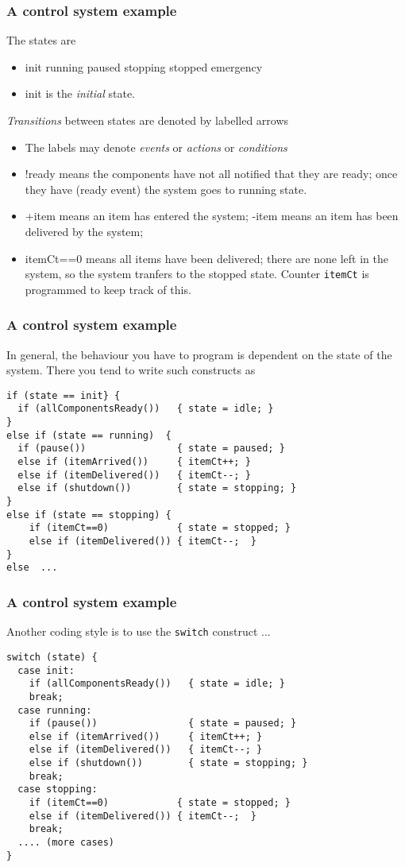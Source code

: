\documentclass[10pt, hyperref={pdfpagelabels=false}]{beamer}
\begin{document}
\begin{frame}
\frametitle{A control system example}
The states are
\begin{itemize}
\item {\color{brown} \large init running paused stopping stopped emergency}
\item {\color{brown} init} is the \emph{initial} state.
\end{itemize}

\emph{Transitions} between states are denoted by labelled arrows
\begin{itemize}
\item The labels may denote \emph{events} or \emph{actions} or \emph{conditions}
\item {\color{blue}!ready} means the components have not all notified that they are ready; once they have ({\color{blue}ready} event) the system goes to {\color{brown}running} state.
\item {\color{blue}+item} means an item has entered the system; {\color{blue}-item} means an item has been delivered by the system;
\item {\color{blue}itemCt==0} means all items have been delivered; there are none left in the system, so the system tranfers to the  {\color{brown}stopped} state. Counter \texttt{itemCt} is  programmed to keep track of this.
\end{itemize}
\end{frame}

\begin{frame} [fragile]
\frametitle{A control system example}
In general, the behaviour you have to program is dependent on the state of the system. There you tend to write such constructs as
{\color{blue}
\begin{verbatim}
if (state == init} {
  if (allComponentsReady())   { state = idle; }
}
else if (state == running)  {
  if (pause())                { state = paused; }
  else if (itemArrived())     { itemCt++; }
  else if (itemDelivered())   { itemCt--; }
  else if (shutdown())        { state = stopping; }
}
else if (state == stopping) {
    if (itemCt==0)            { state = stopped; }
    else if (itemDelivered()) { itemCt--;  }
}
else  ...
\end{verbatim}
}
\end{frame}

\begin{frame} [fragile]
\frametitle{A control system example}
Another coding style is to use the \texttt{switch} construct ...
{\color{blue}
\begin{verbatim}
switch (state) {
  case init:
    if (allComponentsReady())   { state = idle; }
    break;
  case running:
    if (pause())                { state = paused; }
    else if (itemArrived())     { itemCt++; }
    else if (itemDelivered())   { itemCt--; }
    else if (shutdown())        { state = stopping; }
    break;
  case stopping:
    if (itemCt==0)            { state = stopped; }
    else if (itemDelivered()) { itemCt--;  }
    break;
  .... (more cases)
} 
\end{verbatim}
}
\end{frame}
\end{document}
